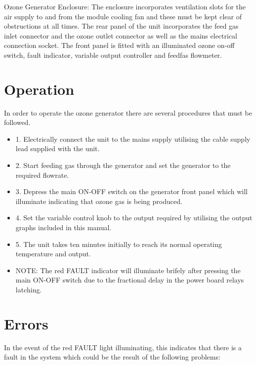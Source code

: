 \documentclass[12pt]{../SOP2}
\begin{document}
\NP Ozone Generator Enclosure: The enclosure incorporates ventilation slots for the air supply to and from the module cooling fan and these must be kept clear of obstructions at all times. The rear panel of the unit incorporates the feed gas inlet connector and the ozone outlet connector as well as the mains electrical connection socket. The front panel is fitted with an illuminated ozone on-off switch, fault indicator, variable output controller and feedfas flowmeter. 

\section{Operation}


\NP In order to operate the ozone generator there are several procedures that must be followed.

\begin{itemize}
  \item 1. Electrically connect the unit to the mains supply utilising the cable supply lead supplied with the unit.
  \item 2. Start feeding gas through the generator and set the generator to the required flowrate.
  \item 3. Depress the main ON-OFF switch on the generator front panel which will illuminate indicating that ozone gas is being produced.
  \item 4. Set the variable control knob to the output required by utilising the output graphs included in this manual.
  \item 5. The unit takes ten minutes initially to reach its normal operating temperature and output. 
  \item NOTE: The red FAULT indicator will illuminate brifely after pressing the main ON-OFF switch due to the fractional delay in the power board relays latching.
\end{itemize}

\section{Errors}

\NP In the event of the red FAULT light illuminating, this indicates that there is a fault in the system which could be the result of the following problems:
\end{document}
